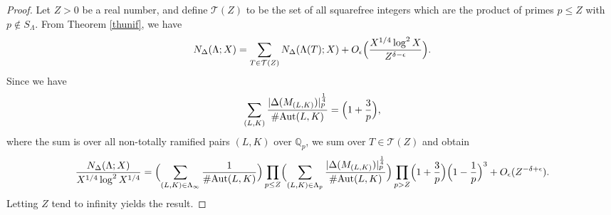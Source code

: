 \documentclass[10pt]{article}
\theoremstyle{plain}
\theoremstyle{definition}
\theoremstyle{remark}
\DeclareMathOperator{\Aut}{Aut}
\def\Aut{{\rm Aut}}
\def\Q{{\mathbb Q}}
\def\Q{{\mathbb Q}}
\def\cT{{\mathcal T}}
\begin{document}
\begin{proof}
Let $Z>0$ be a real number, and define $\cT(Z)$ to be the set of all
squarefree integers which are the product of primes $p\leq Z$ with
$p\not\in S_\Lambda$. From Theorem \ref{thunif}, we have
\begin{equation*}
N_\Delta(\Lambda;X)=\sum_{T\in\cT(Z)}N_\Delta(\Lambda(T);X)+O_\epsilon
\Bigl(\frac{X^{1/4}\log^2 X}{Z^{\delta-\epsilon}}\Bigr).
\end{equation*}
Since we have
\begin{equation*}
\sum_{(L,K)}\frac{|\Delta(M_{(L,K)})|_p^{\frac14}}{\#\Aut(L,K)}=
\Bigl(1+\frac{3}{p}\Bigr),
\end{equation*}
where the sum is over all non-totally ramified pairs $(L,K)$ over
$\Q_p$, we sum over $T\in\cT(Z)$ and obtain
\begin{equation*}
\begin{array}{rcl}
\displaystyle \frac{N_\Delta(\Lambda;X)}{X^{1/4}\log^2 X^{1/4}}=
\displaystyle\Bigl(\sum_{(L,K)\in\Lambda_\infty}
\frac{1}{\#\Aut(L,K)}\Bigr)
\prod_{p\leq Z}\Bigl(\sum_{(L,K)\in\Lambda_p}
\frac{|\Delta(M_{(L,K)})|_p^{\frac14}}{\#\Aut(L,K)}\Bigr)
\prod_{p>Z}\Bigl(1+\frac{3}{p}\Bigr)\Bigl(1-\frac{1}{p}\Bigr)^3
+O_\epsilon(Z^{-\delta+\epsilon}).
\end{array}
\end{equation*}
Letting $Z$ tend to infinity yields the result.
\end{proof}
\end{document}
